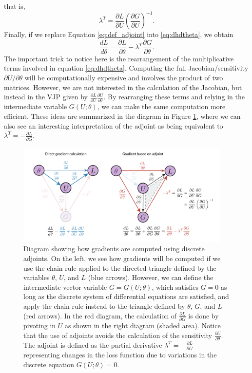 that is,
\begin{equation}
    \lambda^T = \frac{\partial L}{\partial U} \left( \frac{\partial G}{\partial U} \right)^{-1}.
    \label{eq:def_adjoint}
\end{equation}
Finally, if we replace Equation \eqref{eq:def_adjoint} into \eqref{eq:dhdtheta}, we obtain 
\begin{equation}
    \frac{dL}{d\theta} 
    =
    \frac{\partial L}{\partial \theta} 
    - 
    \lambda^T \frac{\partial G}{\partial \theta}.
    \label{eq:gradient-adjoint-state-method}
\end{equation}
The important trick to notice here is the rearrangement of the multiplicative terms involved in equation \eqref{eq:dhdtheta}. 
Computing the full Jacobian/sensitivity $\partial U / \partial \theta$ will be computationally expensive and involves the product of two matrices. 
However, we are not interested in the calculation of the Jacobian, but instead in the VJP given by $\frac{\partial L}{\partial U} \frac{\partial U}{\partial \theta}$. 
By rearranging these terms and relying in the intermediate variable $G(U; \theta)$, we can make the same computation more efficient. 
These ideas are summarized in the diagram in Figure \ref{fig:discrete-adjoint}, where we can also see an interesting interpretation of the adjoint as being equivalent to $\lambda^T = - \frac{\partial L}{\partial G}$. 

\begin{figure}[t]
    \centering
    \includegraphics[width=0.95\textwidth]{figures/discrete_adjoint.pdf}
    \caption{Diagram showing how gradients are computed using discrete adjoints. On the left, we see how gradients will be computed if we use the chain rule applied to the directed triangle defined by the variables $\theta$, $U$, and $L$ (blue arrows). However, we can define the intermediate vector variable $G = G(U; \theta)$, which satisfies $G  = 0$ as long as the discrete system of differential equations are satisfied, and apply the chain rule instead to the triangle defined by $\theta$, $G$, and $L$ (red arrows). In the red diagram, the calculation of $\frac{\partial L}{\partial G}$ is done by pivoting in $U$ as shown in the right diagram (shaded area). Notice that the use of adjoints avoids the calculation of the sensitivity $\frac{\partial U}{\partial \theta}$. The adjoint is defined as the partial derivative $\lambda^T = - \frac{\partial L}{\partial G}$ representing changes in the loss function due to variations in the discrete equation $G(U; \theta) = 0$. 
    }
    \label{fig:discrete-adjoint}
\end{figure}

